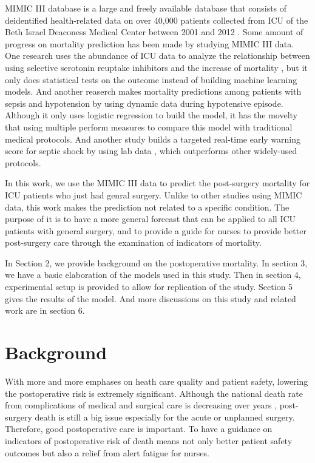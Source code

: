 \documentclass[twoside,11pt]{article}
\begin{document}
MIMIC III database is a large and freely available database that consists of deidentified health-related data on over 40,000 patients collected from ICU of the Beth Israel Deaconess Medical Center between 2001 and 2012 \citet{cite1}. Some amount of progress on mortality prediction has been made by studying MIMIC III data. One research uses the abundance of ICU data to analyze the relationship between using selective serotonin reuptake inhibitors and the increase of mortality \citep{cite2}, but it only does statistical tests on the outcome instead of building machine learning models. And another reaserch makes mortality predictions among patients with sepsis and hypotension by using dynamic data during hypotensive episode\citep{cite3}. Although it only uses logistic regression to build the model, it has the movelty that using multiple perform measures to compare this model with traditional medical protocols. And another study builds a targeted real-time early warning score for septic shock by using lab data \citep{cite4}, which outperforms other widely-used protocols.

In this work, we use the MIMIC III data to predict the post-surgery mortality for ICU patients who just had genral surgery. Unlike to other studies using MIMIC data, this work makes the prediction not related to a specific condition. The purpose of it is to have a more general forecast that can be applied to all ICU patients with general surgery, and to provide a guide for nurses to provide better post-surgery care through the examination of indicators of mortality.

In Section 2, we provide background on the postoperative mortality. In section 3, we have a basic elaboration of the models used in this study. Then in section 4, experimental setup is provided to allow for replication of the study. Section 5 gives the results of the model. And more discussions on this study and related work are in section 6.

\section{Background} \label{background}
With more and more emphases on heath care quality and patient safety, lowering the postoperative risk is extremely significant. Although the national death rate from complications of medical and surgical care is decreasing over years \citet{cite5}, post-surgery death is still a big issue especially for the acute or unplanned surgery. Therefore, good postoperative care is important. To have a guidance on indicators of postoperative risk of death means not only better patient safety outcomes but also a relief from alert fatigue for nurses.
\end{document}
